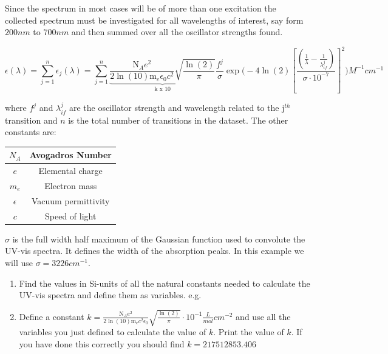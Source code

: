 \documentclass{article}
\begin{document}
Since the spectrum in most cases will be of more than one excitation the collected spectrum must be investigated for all wavelengths of interest, say form $200\si{nm}$ to $700\si{nm}$ and then summed over all the oscillator strengths found.

\begin{equation}
\epsilon(\lambda)=\sum_{j=1}^n \epsilon_j(\lambda)=\sum_{j=1}^n  \underbrace{\frac{\text{N}_A\si{e^2}}{2\ln(10) \text{m}_e \epsilon_0\si{c^2}} \sqrt{\frac{\ln(2)}{\pi}}}_\text{k x 10} \frac{f^j}{\sigma} \exp{\Bigg(-4 \ln(2) \left[\frac{\left(\frac{1}{\lambda}-\frac{1}{\lambda_{if}^j}\right)}{\sigma\cdot 10^{-7}}\right]^2}\Bigg) \si{M^{-1}cm^{-1}} \label{eq_uv_vis}
\end{equation}

where $f^j$ and $\lambda_{if}^j$ are the oscillator strength and wavelength related to the $\text{j}^{th}$ transition and $n$ is the total number of transitions in the dataset. The other constants are:

\begin{center}
\begin{tabular}{|c|c|}
\hline 
$N_A$ & Avogadros Number \\ 
\hline 
$e$ & Elemental charge \\ 
\hline 
$m_e$ & Electron mass \\ 
\hline 
$\epsilon$ & Vacuum permittivity \\ 
\hline 
$c$ & Speed of light \\ 
\hline 
\end{tabular} 
\end{center}



$\sigma$ is the full width half maximum of the Gaussian function used to convolute the UV-vis spectra. It defines the width of the absorption peaks. In this example we will use $\sigma = 3226 \si{cm^{-1}}$.
\begin{enumerate}
\item Find the values in Si-units of all the natural constants needed to calculate the UV-vis spectra and define them as variables. e.g. \\

\item Define a constant $k=\frac{\text{N}_A\si{e^2}}{2\ln(10) \text{m}_e \si{c^2}  \epsilon_0}\sqrt{\frac{\ln(2)}{\pi}}\cdot 10^{-1} \frac{\si{L}}{\si{mol}}\si{cm^{-2}}$ and use all the variables you just defined to calculate the value of $k$. Print the value of $k$. If you have done this correctly you should find
$k=217512853.406$
\end{enumerate}
\end{document}
